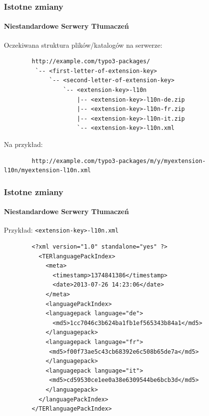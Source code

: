 
\begin{frame}[fragile]
	\frametitle{Istotne zmiany}
	\framesubtitle{Niestandardowe Serwery Tłumaczeń}

	Oczekiwana struktura plików/katalogów na serwerze:

	\begin{lstlisting}
		http://example.com/typo3-packages/
		 `-- <first-letter-of-extension-key>
		     `-- <second-letter-of-extension-key>
		         `-- <extension-key>-l10n
		             |-- <extension-key>-l10n-de.zip
		             |-- <extension-key>-l10n-fr.zip
		             |-- <extension-key>-l10n-it.zip
		             `-- <extension-key>-l10n.xml
	\end{lstlisting}

	Na przykład:

	\begin{lstlisting}
		http://example.com/typo3-packages/m/y/myextension-l10n/myextension-l10n.xml
	\end{lstlisting}

\end{frame}


\begin{frame}[fragile]
	\frametitle{Istotne zmiany}
	\framesubtitle{Niestandardowe Serwery Tłumaczeń}

	Przykład: \texttt{<extension-key>-l10n.xml}

	\lstset{
		basicstyle=\tiny\ttfamily
	}

	\begin{lstlisting}
		<?xml version="1.0" standalone="yes" ?>
		  <TERlanguagePackIndex>
		    <meta>
		      <timestamp>1374841386</timestamp>
		      <date>2013-07-26 14:23:06</date>
		    </meta>
		    <languagePackIndex>
		    <languagepack language="de">
		      <md5>1cc7046c3b624ba1fb1ef565343b84a1</md5>
		    </languagepack>
		    <languagepack language="fr">
		     <md5>f00f73ae5c43cb68392e6c508b65de7a</md5>
		    </languagepack>
		    <languagepack language="it">
		     <md5>cd59530ce1ee0a38e6309544be6bcb3d</md5>
		    </languagepack>
		  </languagePackIndex>
		</TERlanguagePackIndex>
	\end{lstlisting}

\end{frame}

